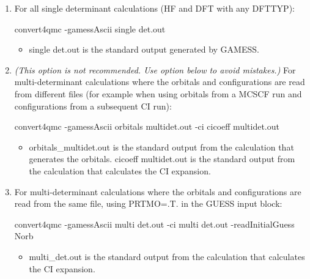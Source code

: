 \begin{enumerate}
  \item{For all single determinant calculations (HF and DFT with any DFTTYP):}
  \begin{shade}
    convert4qmc -gamessAscii single det.out
  \end{shade}
  \begin{itemize}
    \item{single det.out is the standard output generated by GAMESS.}
  \end{itemize}
  \item{\textit{(This option is not recommended. Use option below to avoid mistakes.)} For 
    multi-determinant calculations where the orbitals and configurations are read from different
    files (for example when using orbitals from a MCSCF run and configurations from a
    subsequent CI run):}
  \begin{shade}
    convert4qmc -gamessAscii orbitals multidet.out -ci cicoeff multidet.out
  \end{shade}
  \begin{itemize}
    \item{orbitals\_multidet.out is the standard output from the calculation that generates the
       orbitals. cicoeff multidet.out is the standard output from the calculation that calculates 
       the CI expansion.}
  \end{itemize}
  \item{For multi-determinant calculations where the orbitals and configurations are read from
    the same file, using PRTMO=.T. in the GUESS input block:}
  \begin{shade}
    convert4qmc -gamessAscii multi det.out -ci multi det.out -readInitialGuess Norb
  \end{shade}
  \begin{itemize}
    \item{multi\_det.out is the standard output from the calculation that calculates the CI expansion.}
  \end{itemize}
\end{enumerate}

